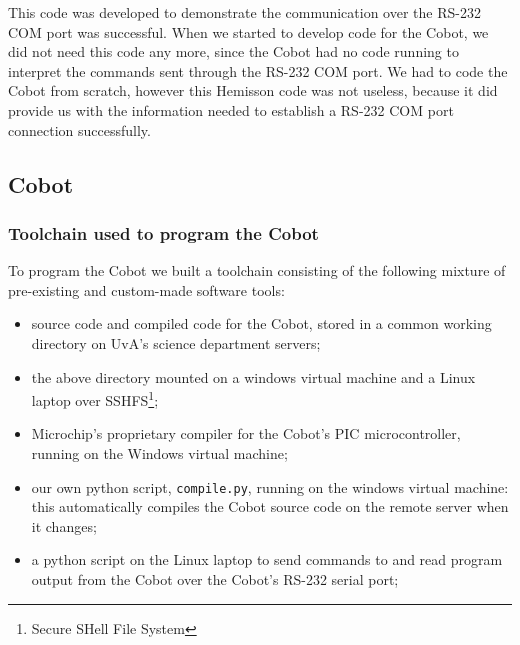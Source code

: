 \documentclass[a4paper,10pt]{article} %
\begin{document}


\noindent This code was developed to demonstrate the communication over the
RS-232 COM port was successful. When we started to develop code for the Cobot,
we did not need this code any more, since the Cobot had no code running to
interpret the commands sent through the RS-232 COM port. We had to code the
Cobot from scratch, however this Hemisson code was not useless, because it did
provide us with the information needed to establish a RS-232 COM port
connection successfully.


\subsection{Cobot} %



\subsubsection{Toolchain used to program the Cobot} %
\label{ssub:Toolchain used to program the Cobot}

To program the Cobot we built a toolchain consisting of the following mixture of
pre-existing and custom-made software tools:

\begin{itemize}
    \item source code and compiled code for the Cobot, stored in a common
    working directory on UvA's science department servers;
    \item  the above directory mounted on a windows virtual machine and a Linux
    laptop over SSHFS\footnote{Secure SHell File System};
    \item Microchip's proprietary compiler for the Cobot's PIC microcontroller,
    running on the Windows virtual machine;
    \item our own python script, \texttt{compile.py}, running on the windows
    virtual machine: this automatically compiles the Cobot source code on the
    remote server when it changes;
    \item a python script on the Linux laptop to send commands to and read program
    output from the Cobot over the Cobot's RS-232 serial port;
\end{itemize}
\end{document}
